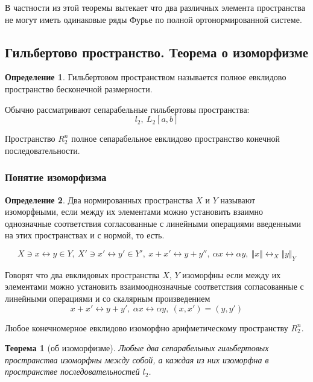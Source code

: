 \documentclass[14pt,a4paper]{extarticle}
\newtheorem{theorem}{Теорема}[section]
\theoremstyle{definition}
\newtheorem{definition}{Определение}[section]
\theoremstyle{remark}
\renewcommand{\[}{\begin{dmath*}[compact]}
\renewcommand{\]}{\end{dmath*}}
\newcommand{\sep}{ , \ \allowbreak }
\begin{document}
В частности из этой теоремы вытекает что два различных элемента пространства
не могут иметь одинаковые ряды Фурье по полной ортонормированной системе.

\subsection{Гильбертово пространство. Теорема о изоморфизме}
\label{subsec:gp_toi}

\begin{definition}
  Гильбертовом пространством называется полное евклидово пространство
  бесконечной размерности.
\end{definition}

Обычно рассматривают сепарабельные гильбертовы пространства:
\[l_2 \sep L_2[a,b]\]

Пространство $R_2^n$ полное сепарабельное евклидово пространство конечной
последовательности.

\subsubsection{Понятие изоморфизма}

\begin{definition}
  Два нормированных пространства $X$ и $Y$ называют изоморфными, если между
  их элементами можно установить взаимно однозначные соответствия
  согласованные с линейными операциями введенными на этих пространствах
  и с нормой, то есть.

  \[X\ni x \leftrightarrow y \in Y \sep
  {X'\ni x' \leftrightarrow y' \in Y'} \sep
  {x + x' \leftrightarrow y + y''} \sep
  {\alpha x \leftrightarrow \alpha y} \sep
  {\Vert x \Vert \leftrightarrow_X \Vert y \Vert_Y}\]
\end{definition}

Говорят что два евклидовых пространства $X$, $Y$ изоморфны если между их
элементами можно установить взаимооднозначные соответствия согласованные
с линейными операциями и со скалярным произведением
\[{x+x' \leftrightarrow y + y'} \sep {\alpha x \leftrightarrow \alpha y}
\sep {(x,x')=(y,y')}\]

Любое конечномерное евклидово изоморфно арифметическому пространству $R_2^n$.

\begin{theorem}[об изоморфизме]
\label{th:об изоморфизме}
  Любые два сепарабельных гильбертовых пространства изоморфны между собой,
  а каждая из них изоморфна в пространстве последовательностей $l_2$.
\end{theorem}
\end{document}
